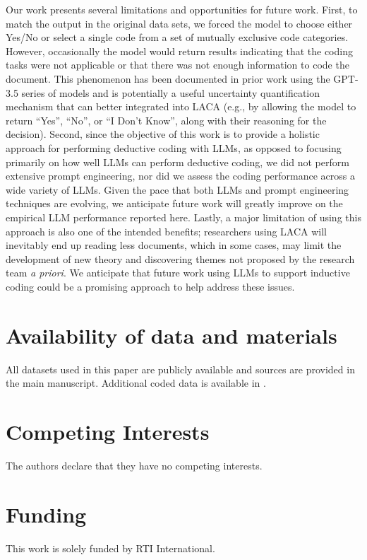 \documentclass{article}
\begin{document}
Our work presents several limitations and opportunities for future work.  First, to match the output in the original data sets, we forced the model to choose either Yes/No or select a single code from a set of mutually exclusive code categories.  However, occasionally the model would return results indicating that the coding tasks were not applicable or that there was not enough information to code the document.  This phenomenon has been documented in prior work using the GPT-3.5 series of models \cite{zhu_can_2023} and is potentially a useful uncertainty quantification mechanism that can better integrated into LACA (e.g., by allowing the model to return “Yes”, “No”, or “I Don’t Know”, along with their reasoning for the decision).  Second, since the objective of this work is to provide a holistic approach for performing deductive coding with LLMs, as opposed to focusing primarily on how well LLMs can perform deductive coding, we did not perform extensive prompt engineering, nor did we assess the coding performance across a wide variety of LLMs. Given the pace that both LLMs and prompt engineering techniques are evolving, we anticipate future work will greatly improve on the empirical LLM performance reported here.  Lastly, a major limitation of using this approach is also one of the intended benefits; researchers using LACA will inevitably end up reading less documents, which in some cases, may limit the development of new theory and discovering themes not proposed by the research team \emph{a priori}.  We anticipate that future work using LLMs to support inductive coding \cite{gao_collabcoder_2023} could be a promising approach to help address these issues. 

\section{Availability of data and materials}
All datasets used in this paper are publicly available and sources are provided in the main manuscript.  Additional coded data is available in \cite{chew_llm-assisted_nodate}.

\section*{Competing Interests}
The authors declare that they have no competing interests.

\section*{Funding}
This work is solely funded by RTI International. 
\end{document}

